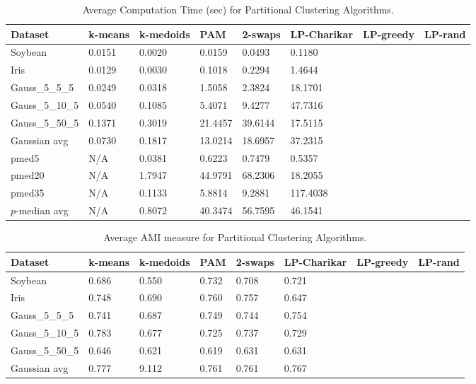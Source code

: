 \documentclass[conference, 10pt, final]{IEEEtran}
\begin{document}
\begin{table}[!t]
\caption{Average Computation Time (sec) for Partitional Clustering Algorithms.}
\centering
\begin{tabular}{ | l | l | l | l | l | l | l | l|}
\hline
Dataset	&	k-means	&	k-medoids	&	PAM	&	2-swaps	&	LP-Charikar	&	LP-greedy	&	LP-rand	\\ \hline
Soybean	&	0.0151	&	0.0020	&	0.0159	&	0.0493	&	0.1180	&		&		\\
Iris	&	0.0129	&	0.0030	&	0.1018	&	0.2294	&	1.4644	&		&		\\
Gauss\_5\_5\_5	&	0.0249	&	0.0318	&	1.5058	&	2.3824	&	18.1701	&		&		\\
Gauss\_5\_10\_5	&	0.0540	&	0.1085	&	5.4071	&	9.4277	&	47.7316	&		&		\\
Gauss\_5\_50\_5	&	0.1371	&	0.3019	&	21.4457	&	39.6144	&	17.5115	&		&		\\
Gaussian avg	&	0.0730	&	0.1817	&	13.0214	&	18.6957	&	37.2315	&		&		\\
pmed5	&	N/A	&	0.0381	&	0.6223	&	0.7479	&	0.5357	&		&		\\
pmed20	&	N/A	&	1.7947	&	44.9791	&	68.2306	&	18.2055	&		&		\\
pmed35	&	N/A	&	0.1133	&	5.8814	&	9.2881	&	117.4038	&		&		\\
$p$-median avg	&	N/A	&	0.8072	&	40.3474	&	56.7595	&	46.1541	&		&		\\ \hline
\end{tabular}
\label{fig:flat_results_comp}
\end{table}

\begin{table}[!t]
\caption{Average AMI measure for Partitional Clustering Algorithms.}
\centering
\begin{tabular}{ | l | l | l | l | l | l | l | l| }
\hline
Dataset	&	k-means	&	k-medoids	&	PAM	&	2-swaps	&	LP-Charikar	&	LP-greedy	&	LP-rand	\\ \hline
Soybean	&	0.686	&	0.550	&	0.732	&	0.708	&	0.721	&		&		\\
Iris	&	0.748	&	0.690	&	0.760	&	0.757	&	0.647	&		&		\\
Gauss\_5\_5\_5	&	0.741	&	0.687	&	0.749	&	0.744	&	0.754	&		&		\\
Gauss\_5\_10\_5	&	0.783	&	0.677	&	0.725	&	0.737	&	0.729	&		&		\\
Gauss\_5\_50\_5	&	0.646	&	0.621	&	0.619	&	0.631	&	0.631	&		&		\\
Gaussian avg	&	0.777	&	9.112	&	0.761	&	0.761	&	0.767	&		&		\\ \hline
\end{tabular}
\label{fig:flat_results_AMI}
\end{table}
\end{document}
